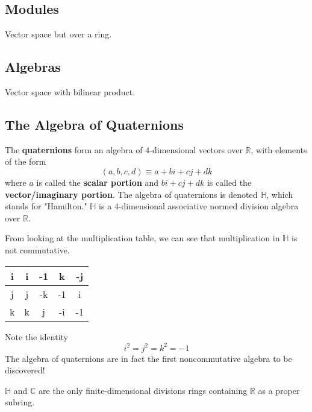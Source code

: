 \subsection{Modules}

  Vector space but over a ring. 

\subsection{Algebras}

  Vector space with bilinear product.  

\subsection{The Algebra of Quaternions}

  \begin{definition}
    The \textbf{quaternions} form an algebra of $4$-dimensional vectors over $\mathbb{R}$, with elements of the form
    \begin{equation}
      (a, b, c, d) \equiv a + bi + cj + dk
    \end{equation}
    where $a$ is called the \textbf{scalar portion} and $bi + cj + dk$ is called the \textbf{vector/imaginary portion}. The algebra of quaternions is denoted $\mathbb{H}$, which stands for "Hamilton." $\mathbb{H}$ is a $4$-dimensional associative normed division algebra over $\mathbb{R}$. 
  \end{definition}

  From looking at the multiplication table, we can see that multiplication in $\mathbb{H}$ is not commutative. 
  \begin{center}
    \begin{tabular}{|c|c|c|c|c|}
    \hline
    i & i & -1 & k & -j \\ 
    \hline
    j & j & -k & -1 & i \\ 
    \hline
    k & k & j & -i & -1 \\ 
    \hline
    \end{tabular}
  \end{center}
  Note the identity 
  \begin{equation}
    i^2 = j^2 = k^2 = -1
  \end{equation}
  The algebra of quaternions are in fact the first noncommutative algebra to be discovered! 

  \begin{theorem}
    $\mathbb{H}$ and $\mathbb{C}$ are the only finite-dimensional divisions rings containing $\mathbb{R}$ as a proper subring. 
  \end{theorem}

